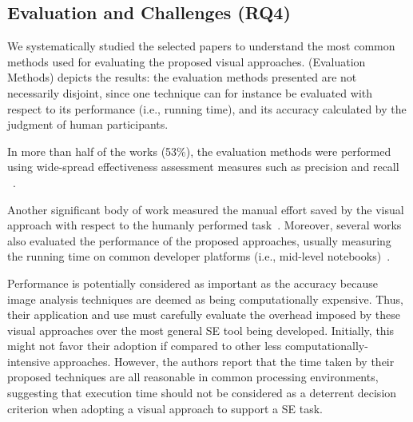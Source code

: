 \subsection{Evaluation and Challenges (RQ4)}



We systematically studied the selected papers to 
understand the most common methods used for 
evaluating the proposed visual approaches.
 (Evaluation 
Methods) depicts the results: the evaluation 
methods presented are not necessarily disjoint,
since one technique can for instance be evaluated 
with respect to its performance (i.e., running time), 
and its accuracy calculated by the judgment of human participants.

In more than half of the works (53\%), the 
evaluation methods were performed using 
wide-spread effectiveness assessment 
measures such as precision and recall
~\cite{Choudhary-2010-ICSM, Choudhary-2012-ICST, 
Choudhary-2013-ICSE, Lin-2014-TSE, Nguyen-2015-ASE, 
Mahajan-2015-ICST, Hori-2015-SEKE, Feng-2016-ASE, 
Patric-2016-ASE, Wan-2017-STVR, He-2016-ICWS, 
Bao-2017-EMSE, Chen-2017-IUI, Reiss-2018-ASEj, 
Kirac-2018-JSS, canvas_icst2018, Kuchta-2018-EMSE, 
Xu-2018-TOIT}.

Another significant body of work measured 
the manual effort saved by the visual approach 
with respect to the humanly performed 
task~\cite{Delamaro-2011-STVR, Li-2010-CHI, 
Li-2010-CHI, Semenenko-2013-ICSM, Mahajan-2015-ICST, 
Feng-2016-ASE, Chen-2017-IUI, Leotta-2018-STVR, 
Reiss-2018-ASEj}. 
Moreover, several works also evaluated the 
performance of the proposed approaches, 
usually measuring the running time on common 
developer platforms (i.e., mid-level 
notebooks)~\cite{Nguyen-2015-ASE, Selay-2014-DICTA, 
Hori-2015-SEKE, Patric-2016-ASE, Wan-2017-STVR, 
Bao-2017-EMSE, Reiss-2018-ASEj, Kirac-2018-JSS}.

Performance is potentially considered as 
important as the accuracy because image analysis 
techniques are deemed as being computationally 
expensive. Thus, their application and use must 
carefully evaluate the overhead imposed by 
these visual approaches over the most general 
SE tool being developed. Initially, this might 
not favor their adoption if compared to other 
less computationally-intensive approaches.
However, the authors report that the time 
taken by their proposed techniques are all 
reasonable in common processing environments, 
suggesting that execution time should not be 
considered as a deterrent decision criterion when 
adopting a visual approach to support a SE task.

